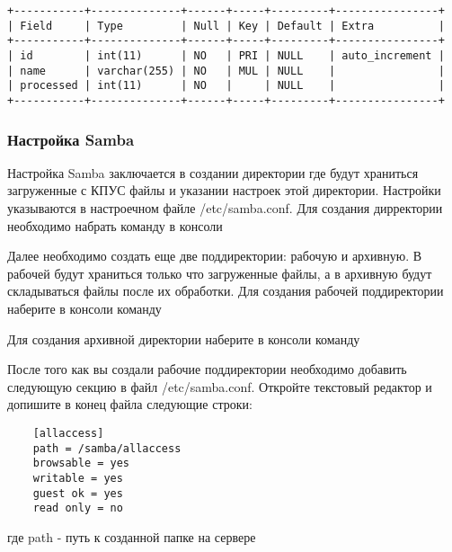 \documentclass[12pt]{article}[a4paper,14pt,russian]
\begin{document}
\begin{enumerate}
	\begin{verbatim}
+-----------+--------------+------+-----+---------+----------------+
| Field     | Type         | Null | Key | Default | Extra          |
+-----------+--------------+------+-----+---------+----------------+
| id        | int(11)      | NO   | PRI | NULL    | auto_increment |
| name      | varchar(255) | NO   | MUL | NULL    |                |
| processed | int(11)      | NO   |     | NULL    |                |
+-----------+--------------+------+-----+---------+----------------+

\end{verbatim}

	\end{enumerate} 


	
	\subsubsection { Настройка Samba}
	
	Настройка Samba заключается в создании директории где будут храниться загруженные с КПУС файлы и указании настроек этой директории. Настройки указываются в настроечном файле /etc/samba.conf.
	Для создания дирректории  необходимо набрать команду в консоли
	\begin{center}
	\end{center}
	Далее необходимо создать еще две поддиректории: рабочую и архивную. В рабочей будут храниться только что загруженные файлы, а в архивную будут складываться файлы после их обработки. 
	Для создания рабочей поддиректории наберите в консоли команду
	\begin{center}
	\end{center}
	Для создания архивной директории наберите в консоли команду
	\begin{center}
	\end{center}
	После того как вы создали рабочие поддиректории необходимо  добавить следующую секцию в файл /etc/samba.conf. Откройте текстовый редактор и допишите в конец файла следующие строки:
	\begin {verbatim}
	[allaccess]
	path = /samba/allaccess
	browsable = yes
	writable = yes
	guest ok = yes
	read only = no
\end{verbatim}
где path - путь к созданной папке на сервере
\end{document}
